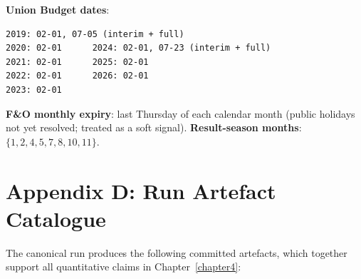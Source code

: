 \textbf{Union Budget dates}:
\begin{small}
\begin{verbatim}
2019: 02-01, 07-05 (interim + full)
2020: 02-01      2024: 02-01, 07-23 (interim + full)
2021: 02-01      2025: 02-01
2022: 02-01      2026: 02-01
2023: 02-01
\end{verbatim}
\end{small}

\textbf{F\&O monthly expiry}: last Thursday of each calendar month (public holidays not yet resolved; treated as a soft signal). \textbf{Result-season months}: $\{1, 2, 4, 5, 7, 8, 10, 11\}$.

\section*{Appendix D: Run Artefact Catalogue}

The canonical run produces the following committed artefacts, which together support all quantitative claims in Chapter~\ref{chapter4}:

